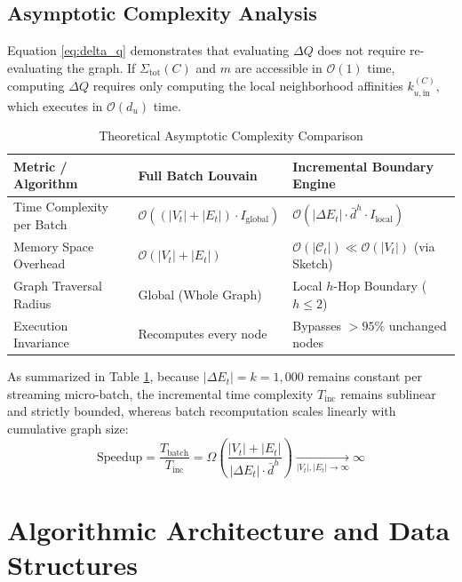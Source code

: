 \documentclass[10pt,journal,compsoc]{IEEEtran}
\begin{document}
\subsection{Asymptotic Complexity Analysis}
Equation \eqref{eq:delta_q} demonstrates that evaluating $\Delta Q$ does not require re-evaluating the graph. If $\Sigma_{\text{tot}}(C)$ and $m$ are accessible in $\mathcal{O}(1)$ time, computing $\Delta Q$ requires only computing the local neighborhood affinities $k_{u, \text{in}}^{(C)}$, which executes in $\mathcal{O}(d_u)$ time.

\begin{table}[h]
\centering
\caption{Theoretical Asymptotic Complexity Comparison}
\label{tab:asymptotic_complexity}
\begin{tabular}{lll}
\toprule
\textbf{Metric / Algorithm} & \textbf{Full Batch Louvain} & \textbf{Incremental Boundary Engine} \\
\midrule
Time Complexity per Batch & $\mathcal{O}\left((|V_t| + |E_t|) \cdot I_{\text{global}}\right)$ & $\mathcal{O}\left(|\Delta E_t| \cdot \bar{d}^h \cdot I_{\text{local}}\right)$ \\
Memory Space Overhead & $\mathcal{O}(|V_t| + |E_t|)$ & $\mathcal{O}(|\mathcal{C}_t|) \ll \mathcal{O}(|V_t|)$ (via Sketch) \\
Graph Traversal Radius & Global (Whole Graph) & Local $h$-Hop Boundary ($h \le 2$) \\
Execution Invariance & Recomputes every node & Bypasses $> 95\%$ unchanged nodes \\
\bottomrule
\end{tabular}
\end{table}

As summarized in Table \ref{tab:asymptotic_complexity}, because $|\Delta E_t| = k = 1,000$ remains constant per streaming micro-batch, the incremental time complexity $T_{\text{inc}}$ remains sublinear and strictly bounded, whereas batch recomputation scales linearly with cumulative graph size:
\begin{equation}
\text{Speedup} = \frac{T_{\text{batch}}}{T_{\text{inc}}} = \Omega\left( \frac{|V_t| + |E_t|}{|\Delta E_t| \cdot \bar{d}^h} \right) \xrightarrow[|V_t|, |E_t| \to \infty]{} \infty
\end{equation}

\section{Algorithmic Architecture and Data Structures}\label{sec:algorithms}
\end{document}
